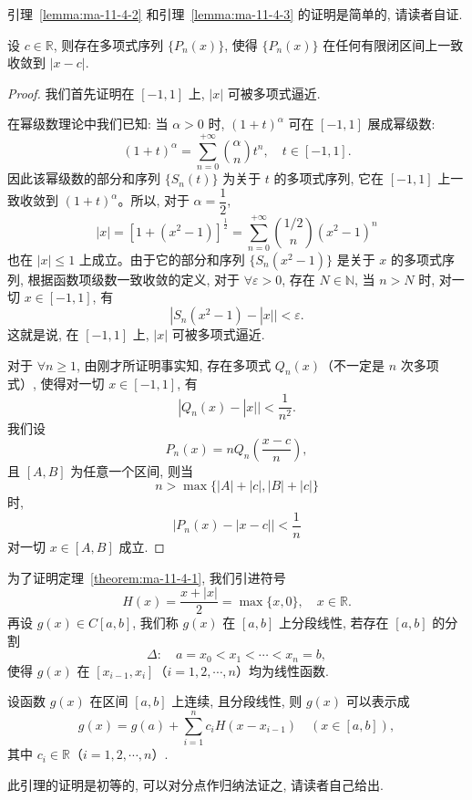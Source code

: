引理~\ref{lemma:ma-11-4-2} 和引理~\ref{lemma:ma-11-4-3} 的证明是简单的, 请读者自证.

\begin{lemma}\label{lemma:ma-11-4-4}
设 $c\in\mathbb R$, 则存在多项式序列 $\{P_n(x)\}$, 使得 $\{P_n(x)\}$ 在任何有限闭区间上一致收敛到 $|x-c|$.
\end{lemma}


\begin{proof}
我们首先证明在 $[-1,1]$ 上, $|x|$ 可被多项式逼近.

在幂级数理论中我们已知: 当 $\alpha>0$ 时, $(1+t)^\alpha$ 可在 $[-1,1]$ 展成幂级数:
\[
  (1+t)^\alpha=\sum_{n=0}^{+\infty}\binom{\alpha}{n}t^n,
  \quad t\in[-1,1].
\]
因此该幂级数的部分和序列 $\{S_n(t)\}$ 为关于 $t$ 的多项式序列, 它在 $[-1,1]$ 上一致收敛到 $(1+t)^\alpha$。所以, 对于 $\alpha=\dfrac12$,
\[
  |x|
  =
  [1+(x^2-1)]^{\frac12}
  =
  \sum_{n=0}^{+\infty}\binom{1/2}{n}(x^2-1)^n
\]
也在 $|x|\leqslant1$ 上成立。由于它的部分和序列 $\{S_n(x^2-1)\}$ 是关于 $x$ 的多项式序列, 根据函数项级数一致收敛的定义, 对于 $\forall\varepsilon>0$, 存在 $N\in\mathbb N$, 当 $n>N$ 时, 对一切 $x\in[-1,1]$, 有
\[
  |S_n(x^2-1)-|x||<\varepsilon.
\]
这就是说, 在 $[-1,1]$ 上, $|x|$ 可被多项式逼近.

对于 $\forall n\geqslant1$, 由刚才所证明事实知, 存在多项式 $Q_n(x)$（不一定是 $n$ 次多项式）, 使得对一切 $x\in[-1,1]$, 有
\[
  |Q_n(x)-|x||<\frac1{n^2}.
\]
我们设
\[
  P_n(x)=nQ_n\left(\frac{x-c}{n}\right),
\]
且 $[A,B]$ 为任意一个区间, 则当
\[
  n>\max\{|A|+|c|,|B|+|c|\}
\]
时,
\[
  |P_n(x)-|x-c||<\frac1n
\]
对一切 $x\in[A,B]$ 成立.
\end{proof}


为了证明定理~\ref{theorem:ma-11-4-1}, 我们引进符号
\[
  H(x)=\frac{x+|x|}{2}=\max\{x,0\},\quad x\in\mathbb R.
\]
再设 $g(x)\in C[a,b]$, 我们称 $g(x)$ 在 $[a,b]$ 上分段线性, 若存在 $[a,b]$ 的分割
\[
  \Delta:\quad a=x_0<x_1<\cdots<x_n=b,
\]
使得 $g(x)$ 在 $[x_{i-1},x_i]$（$i=1,2,\cdots,n$）均为线性函数.

\begin{lemma}\label{lemma:ma-11-4-5}
设函数 $g(x)$ 在区间 $[a,b]$ 上连续, 且分段线性, 则 $g(x)$ 可以表示成
\[
  g(x)=g(a)+\sum_{i=1}^{n}c_iH(x-x_{i-1})
  \quad(x\in[a,b]),
\]
其中 $c_i\in\mathbb R$（$i=1,2,\cdots,n$）.
\end{lemma}

此引理的证明是初等的, 可以对分点作归纳法证之, 请读者自己给出.

